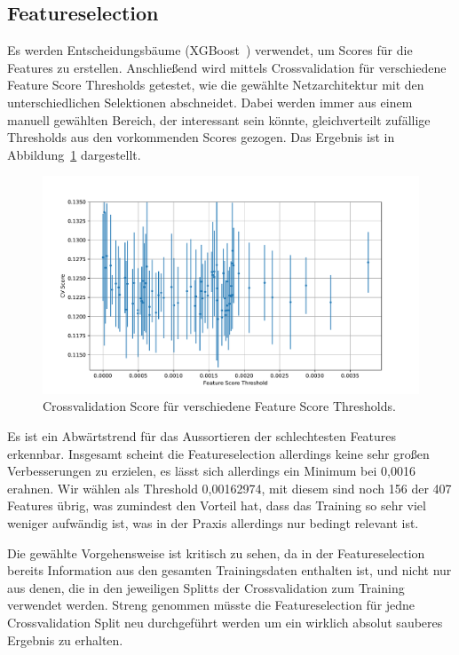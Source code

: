 \documentclass[a4paper, 11pt]{article}
\begin{document}
\subsection*{Featureselection}
Es werden Entscheidungsbäume (XGBoost~\cite{xgboost}) verwendet, um Scores für die Features zu erstellen. Anschließend wird mittels Crossvalidation für verschiedene Feature Score Thresholds getestet, wie die gewählte Netzarchitektur mit den unterschiedlichen Selektionen abschneidet. Dabei werden immer aus einem manuell gewählten Bereich, der interessant sein könnte, gleichverteilt zufällige Thresholds aus den vorkommenden Scores gezogen. Das Ergebnis ist in Abbildung~\ref{fig:fs} dargestellt.
\begin{figure}
    \centering
    \includegraphics[width=\textwidth]{../Challenge/feature_scores.pdf}
    \caption{Crossvalidation Score für verschiedene Feature Score Thresholds.}
    \label{fig:fs}
\end{figure}

Es ist ein Abwärtstrend für das Aussortieren der schlechtesten Features erkennbar. Insgesamt scheint die Featureselection allerdings keine sehr großen Verbesserungen zu erzielen, es lässt sich allerdings ein Minimum bei 0,0016 erahnen. Wir wählen als Threshold 0,00162974, mit diesem sind noch 156 der 407 Features übrig, was zumindest den Vorteil hat, dass das Training so sehr viel weniger aufwändig ist, was in der Praxis allerdings nur bedingt relevant ist.

Die gewählte Vorgehensweise ist kritisch zu sehen, da in der Featureselection bereits Information aus den gesamten Trainingsdaten enthalten ist, und nicht nur aus denen, die in den jeweiligen Splitts der Crossvalidation zum Training verwendet werden. Streng genommen müsste die Featureselection für jedne Crossvalidation Split neu durchgeführt werden um ein wirklich absolut sauberes Ergebnis zu erhalten.
\end{document}
